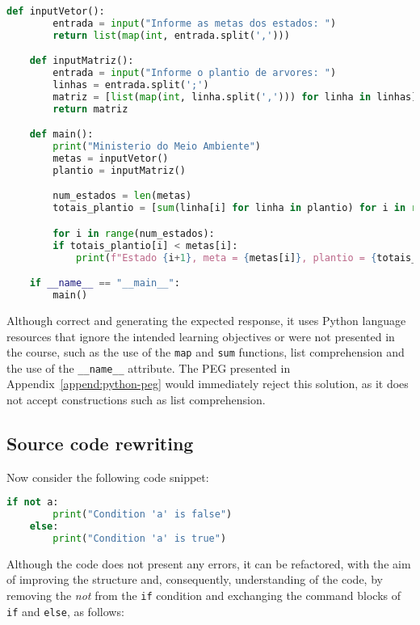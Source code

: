\begin{lstlisting}[language=Python, breaklines]
    def inputVetor():
        entrada = input("Informe as metas dos estados: ")
        return list(map(int, entrada.split(',')))

    def inputMatriz():
        entrada = input("Informe o plantio de arvores: ")
        linhas = entrada.split(';')
        matriz = [list(map(int, linha.split(','))) for linha in linhas]
        return matriz

    def main():
        print("Ministerio do Meio Ambiente")
        metas = inputVetor()
        plantio = inputMatriz()

        num_estados = len(metas)
        totais_plantio = [sum(linha[i] for linha in plantio) for i in range(num_estados)]

        for i in range(num_estados):
        if totais_plantio[i] < metas[i]:
            print(f"Estado {i+1}, meta = {metas[i]}, plantio = {totais_plantio[i]}")

    if __name__ == "__main__":
        main()
\end{lstlisting}

Although correct and generating the expected response, it uses Python language
resources that ignore the intended learning objectives or were not presented
in the course, such as the use of the \texttt{map} and \texttt{sum} functions,
list comprehension and the use of the \texttt{\_\_name\_\_} attribute.
The PEG presented in Appendix~\ref{append:python-peg} would immediately reject
this solution, as it does not accept constructions such as list comprehension.


\subsection{Source code rewriting}

Now consider the following code snippet:

\begin{lstlisting}[language=Python]
    if not a:
        print("Condition 'a' is false")
    else:
        print("Condition 'a' is true")
\end{lstlisting}

Although the code does not present any errors, it can be refactored, with the
aim of improving the structure and, consequently, understanding of the code, by
removing the \textit{not} from the \texttt{if} condition and exchanging the
command blocks of \texttt{if} and \texttt{else}, as follows:

